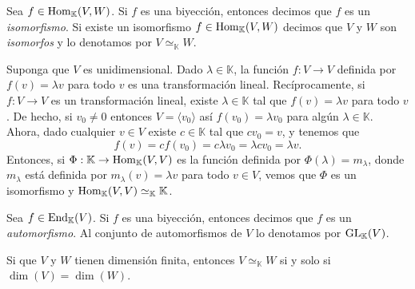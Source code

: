 \begin{defn}
Sea $f\in\operatorname{Hom}_{\mathbb{K}}(V,W)$. Si $f$ es una biyecci\'on, entonces decimos que $f$ es un \emph{isomorfismo}. Si existe un isomorfismo $f\in\operatorname{Hom}_{\mathbb{K}}(V,W)$ decimos que $V$ y $W$ son \emph{isomorfos} y lo denotamos por $V\simeq_{\mathbb{K}} W$.
\end{defn}

\begin{ejem} Suponga que $V$ es unidimensional. Dado $\lambda\in \mathbb{K}$, la funci\'on $f:V\rightarrow V$ definida por $f(v)=\lambda v$ para todo $v$ es una transformaci\'on lineal. Rec\'iprocamente, si $f:V\rightarrow V$ es un transformaci\'on lineal, existe $\lambda\in \mathbb{K}$ tal que $f(v)=\lambda v$ para todo $v$. De hecho, si $v_0\ne 0$ entonces $V=\langle v_0\rangle$ as\'i $f(v_0)=\lambda v_0$ para alg\'un $\lambda\in \mathbb{K}$. Ahora, dado cualquier $v\in V$ existe $c\in \mathbb{K}$ tal que $cv_0=v$, y tenemos que
\[
f(v)=cf(v_0)=c\lambda v_0=\lambda cv_0=\lambda v.
\]
Entonces, si $\Phi: \mathbb{K} \rightarrow \operatorname{Hom}_{\mathbb{K}}(V,V)$ es la funci\'on definida por $\Phi(\lambda)=m_\lambda$, donde $m_\lambda$ está definida por $m_\lambda(v)=\lambda v$ para todo $v\in V$, vemos que $\Phi$ es un isomorfismo y $\operatorname{Hom}_{\mathbb{K}}(V,V)\simeq_{\mathbb{K}} \mathbb{K}$.
\end{ejem}

\begin{defn}
Sea $f\in\operatorname{End}_{\mathbb{K}}(V)$. Si $f$ es una biyecci\'on, entonces decimos que $f$ es un \emph{automorfismo}. Al conjunto de automorfismos de $V$ lo denotamos por $\operatorname{GL}_{\mathbb{K}}(V)$.
\end{defn}

\begin{teo}
Si que $V$ y $W$ tienen dimensi\'on finita, entonces $V\simeq_{\mathbb{K}} W$ si y solo si $\dim(V)=\dim(W)$.
\end{teo}


